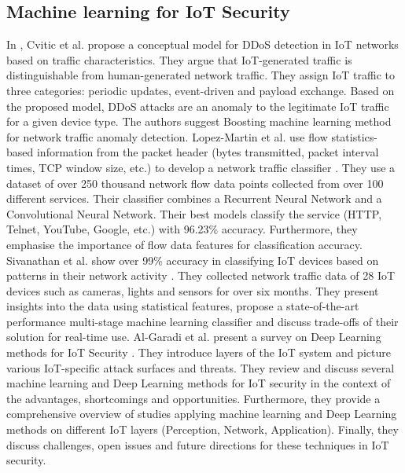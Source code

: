 \documentclass[conference, 11pt]{IEEEtran}
\begin{document}
    \subsection{Machine learning for IoT Security}
    In \cite{cvitic2021novel}, Cvitic et al. propose a conceptual model for DDoS detection in IoT networks based on traffic characteristics.
    They argue that IoT-generated traffic is distinguishable from human-generated network traffic.
    They assign IoT traffic to three categories: periodic updates, event-driven and payload exchange.
    Based on the proposed model, DDoS attacks are an anomaly to the legitimate IoT traffic for a given device type.
    The authors suggest Boosting machine learning method for network traffic anomaly detection.
    Lopez-Martin et al. use flow statistics-based information from the packet header (bytes transmitted, packet interval times, TCP window size, etc.) to develop a network traffic classifier \cite{lopez2017network}.
    They use a dataset of over 250 thousand network flow data points collected from over 100 different services.
    Their classifier combines a Recurrent Neural Network and a Convolutional Neural Network.
    Their best models classify the service (HTTP, Telnet, YouTube, Google, etc.) with 96.23\% accuracy.
    Furthermore, they emphasise the importance of flow data features for classification accuracy.
    Sivanathan et al. show over 99\% accuracy in classifying IoT devices based on patterns in their network activity \cite{sivanathan2018classifying}.
    They collected network traffic data of 28 IoT devices such as cameras, lights and sensors for over six months.
    They present insights into the data using statistical features, propose a state-of-the-art performance multi-stage machine learning classifier and discuss trade-offs of their solution for real-time use.
    Al-Garadi et al. present a survey on Deep Learning methods for IoT Security \cite{article:5}.
    They introduce layers of the IoT system and picture various IoT-specific attack surfaces and threats.
    They review and discuss several machine learning and Deep Learning methods for IoT security in the context of the advantages, shortcomings and opportunities.
    Furthermore, they provide a comprehensive overview of studies applying machine learning and Deep Learning methods on different IoT layers (Perception, Network, Application).
    Finally, they discuss challenges, open issues and future directions for these techniques in IoT security.
\end{document}
